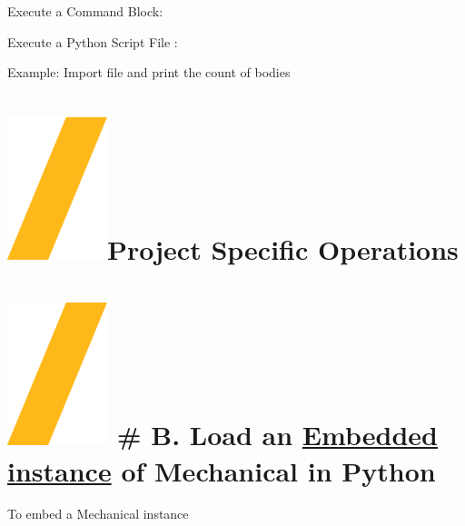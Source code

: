 \documentclass[9pt,landscape]{article}
\begin{document}
\begin{multicols}{3}

Execute a Command Block:


Execute a Python Script File :


Example: Import file and print the count of bodies



\vfill
\section{\includegraphics[height=\fontcharht\font`\S]{slash.png}Project Specific Operations}


\section{\includegraphics[height=\fontcharht\font`\S]{slash.png} # B. Load an  \underline{Embedded instance}  of Mechanical in Python}
To embed a Mechanical instance



\end{multicols}
\end{document}
